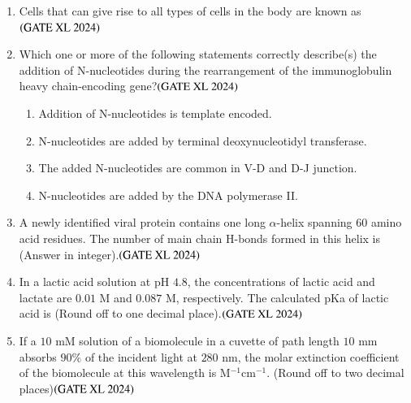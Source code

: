 \documentclass[journal]{IEEEtran}
\begin{document}
\begin{enumerate}
    \item Cells that can give rise to all types of cells in the body are known as\hfill $\left(\text{GATE XL 2024}\right)$
    \begin{enumerate}
    \end{enumerate}

    \item Which one or more of the following statements correctly describe(s) the addition of N-nucleotides during the rearrangement of the immunoglobulin heavy chain-encoding gene?\hfill $\left(\text{GATE XL 2024}\right)$
    \begin{enumerate}
            \item Addition of N-nucleotides is template encoded.
            \item N-nucleotides are added by terminal deoxynucleotidyl transferase.
            \item The added N-nucleotides are common in V-D and D-J junction.
            \item N-nucleotides are added by the DNA polymerase II.
    \end{enumerate}

    \item A newly identified viral protein contains one long $\alpha$-helix spanning $60$ amino acid residues. The number of main chain H-bonds formed in this helix is (Answer in integer).\hfill $\left(\text{GATE XL 2024}\right)$

    \item In a lactic acid solution at pH $4.8$, the concentrations of lactic acid and lactate are $0.01$ M and $0.087$ M, respectively. The calculated pKa of lactic acid is (Round off to one decimal place).\hfill $\left(\text{GATE XL 2024}\right)$

    \item If a $10$ mM solution of a biomolecule in a cuvette of path length $10$ mm absorbs $90\%$ of the incident light at $280$ nm, the molar extinction coefficient of the biomolecule at this wavelength is M$^{-1}$cm$^{-1}$. (Round off to two decimal places)\hfill $\left(\text{GATE XL 2024}\right)$


\end{enumerate}
\end{document}
